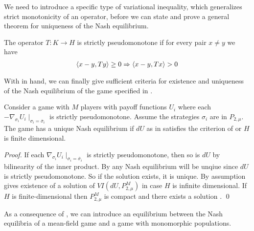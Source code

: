 We need to introduce a specific type of variational inequality, which generalizes strict monotonicity of an operator, before we can state and prove a general theorem for uniqueness of the Nash equilibrium.
\begin{definition}
  \label{def:strict_pm}
 The operator $T: K \to H$ is strictly pseudomonotone if for every pair $x\neq y$ we have
 \begin{align}
   \left \langle x-y,Ty \right \rangle \geq 0 \Rightarrow \left \langle x-y,Tx \right \rangle > 0
 \end{align}
\end{definition}
With  in hand, we can finally give sufficient criteria for existence and uniqueness of the Nash equilibrium of the game specified in .
\begin{theorem} \label{thm:nash_unique}
  Consider a game with $M$ players with payoff functions $U_i$ where each $-\nabla_{\sigma_i} U_i \mid_{\sigma_i = \overbar{\sigma}_i}$ is strictly pseudomonotone. Assume the strategies $\sigma_i$ are in $P_{2,\mu}$. The game has a unique Nash equilibrium if $dU$ as in  satisfies the criterion of  or $H$ is finite dimensional.
\end{theorem}
\begin{proof}
   If each $\nabla_{\sigma_i} U_i \mid_{\sigma_i = \overbar{\sigma}_i}$ is strictly pseudomonotone, then so is $dU$ by bilinearity of the inner product. By  any Nash equilibrium will be unqiue since $dU$ is strictly pseudomonotone. So if the solution exists, it is unique. By assumption  gives existence of a solution of $VI(dU,P_{2,\mu}^M)$ in case $H$ is infinite dimensional. If $H$ is finite-dimensional then $P_{2,\mu}^M$ is compact and there exists a solution . \qed
\end{proof}
As a consequence of , we can introduce an equilibrium between the Nash equilibria of a mean-field game and a game with monomorphic populations.
